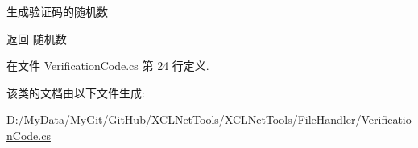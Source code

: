 生成验证码的随机数 

\begin{DoxyReturn}{返回}
随机数
\end{DoxyReturn}


在文件 Verification\-Code.\-cs 第 24 行定义.



该类的文档由以下文件生成\-:\begin{DoxyCompactItemize}
\item 
D\-:/\-My\-Data/\-My\-Git/\-Git\-Hub/\-X\-C\-L\-Net\-Tools/\-X\-C\-L\-Net\-Tools/\-File\-Handler/\hyperlink{_verification_code_8cs}{Verification\-Code.\-cs}\end{DoxyCompactItemize}
